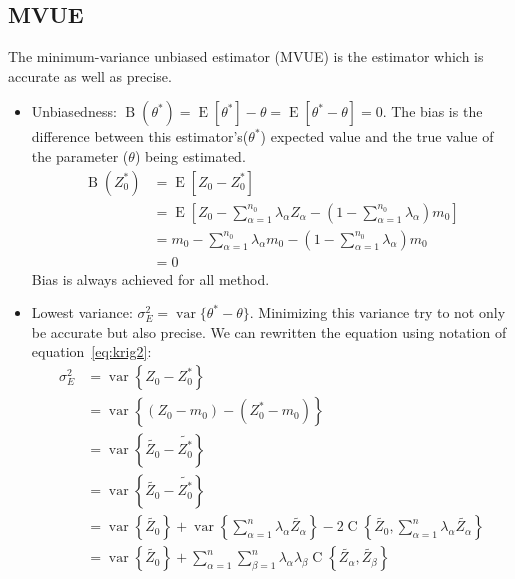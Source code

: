 \documentclass[twocolumn]{article}
\numberwithin{equation}{section}
\begin{document}
\subsection{MVUE}
The minimum-variance unbiased estimator (MVUE) is the estimator which is accurate as well as precise.
\begin{itemize}
	\item Unbiasedness: $\operatorname{B}( \theta^*) = \operatorname{E}[\theta^*]-\theta= \operatorname{E}[\theta^*-\theta]=0$. The bias is the difference between this estimator's($\theta^*$) expected value and the true value of the parameter ($\theta$) being estimated. 
	\begin{align*}
		\operatorname{B}(Z^*_0)	&= \operatorname{E}\left[Z_0 - Z^*_0\right]\\
		  						&= \operatorname{E}\left[Z_0 - \sum_{\alpha=1}^{n_0} \lambda_\alpha Z_\alpha  - \left( 1- \sum_{\alpha=1}^{n_0} \lambda_\alpha\right)m_0 \right]\\		  																				&= m_0 - \sum_{\alpha=1}^{n_0} \lambda_\alpha m_0 - \left( 1- \sum_{\alpha=1}^{n_0} \lambda_\alpha\right)m_0 \\
		 						&= 0
	\end{align*}
	Bias is always achieved for all method.
	\item Lowest variance: $\sigma^2_E=\operatorname{var}\{\theta^*-\theta\}$. Minimizing this variance try to not only be accurate but also precise. We can rewritten the equation using notation of equation~\ref{eq:krig2}:
	\begin{align} \label{eq:variance}
		\sigma^2_E 	&= \operatorname{var} \left\{ Z_0-Z^*_0 \right\} \nonumber\\
						&= \operatorname{var} \left\{ (Z_0-m_0) - (Z^*_0-m_0) \right\} \nonumber\\
						&= \operatorname{var} \left\{ \tilde{Z_0}-\tilde{Z^*_0} \right\} \nonumber \\
						&= \operatorname{var} \left\{ \tilde{Z_0}-\tilde{Z^*_0} \right\} \nonumber \\
						&= \operatorname{var}\left\{\tilde{Z_0}\right\}  +  \operatorname{var}\left\{\sum_{\alpha=1}^n \lambda_\alpha \tilde{Z_\alpha}\right\} -  2 \operatorname{C}\left\{\tilde{Z_0},\sum_{\alpha=1}^n \lambda_\alpha \tilde{Z_\alpha}\right\} \nonumber\\
						&= \operatorname{var}\left\{\tilde{Z_0}\right\}    + \sum_{\alpha=1}^n \sum_{\beta=1}^n \lambda_\alpha \lambda_\beta \operatorname{C}\left\{\tilde{Z_\alpha},\tilde{Z_\beta}\right\} \nonumber \\

\end{align}
\end{itemize}
\end{document}
